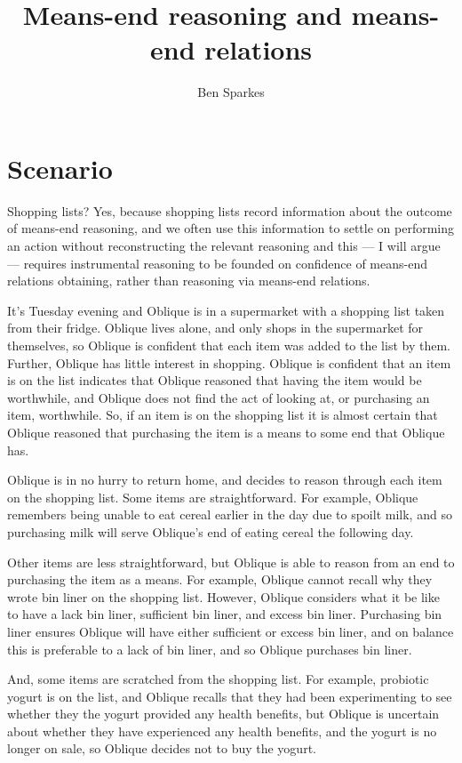 \documentclass[10pt]{article}
\title{Means-end reasoning and means-end relations}
\author{Ben Sparkes}
\newcommand{\hozlinedash}[0]{%
  \noindent\hdashrule[0.5ex][c]{\textwidth}{.1pt}{2.5pt}
}
\begin{document}
\section{Scenario}
\label{sec:scenario-1}

\noindent Shopping lists?\newline
Yes, because shopping lists record information about the outcome of means-end reasoning, and we often use this information to settle on performing an action without reconstructing the relevant reasoning and this --- I will argue --- requires instrumental reasoning to be founded on confidence of means-end relations obtaining, rather than reasoning via means-end relations.

\hozlinedash

\begin{scenario}
  It's Tuesday evening and Oblique is in a supermarket with a shopping list taken from their fridge.
  Oblique lives alone, and only shops in the supermarket for themselves, so Oblique is confident that each item was added to the list by them.
  Further, Oblique has little interest in shopping.
  Oblique is confident that an item is on the list indicates that Oblique reasoned that having the item would be worthwhile, and Oblique does not find the act of looking at, or purchasing an item, worthwhile.
  So, if an item is on the shopping list it is almost certain that Oblique reasoned that purchasing the item is a means to some end that Oblique has.

  Oblique is in no hurry to return home, and decides to reason through each item on the shopping list.
  Some items are straightforward.
  For example, Oblique remembers being unable to eat cereal earlier in the day due to spoilt milk, and so purchasing milk will serve Oblique's end of eating cereal the following day.

  Other items are less straightforward, but Oblique is able to reason from an end to purchasing the item as a means.
  For example, Oblique cannot recall why they wrote bin liner on the shopping list.
  However, Oblique considers what it be like to have a lack bin liner, sufficient bin liner, and excess bin liner.
  Purchasing bin liner ensures Oblique will have either sufficient or excess bin liner, and on balance this is preferable to a lack of bin liner, and so Oblique purchases bin liner.

  And, some items are scratched from the shopping list.
  For example, probiotic yogurt is on the list, and Oblique recalls that they had been experimenting to see whether they the yogurt provided any health benefits, but Oblique is uncertain about whether they have experienced any health benefits, and the yogurt is no longer on sale, so Oblique decides not to buy the yogurt.


\end{scenario}
\end{document}
